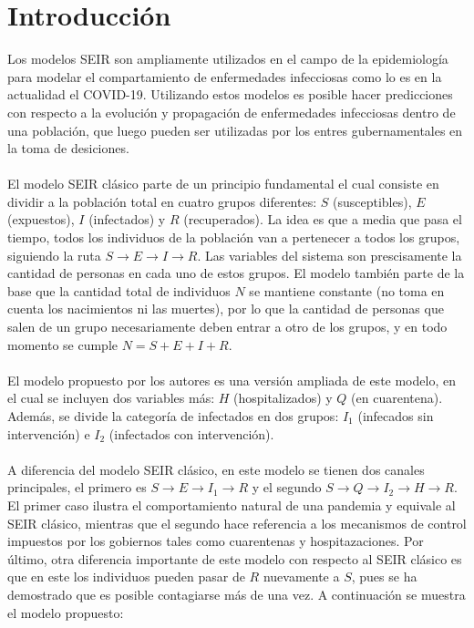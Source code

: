 \documentclass[conference]{IEEEtran}
\begin{document}
\section{Introducción}
Los modelos SEIR son ampliamente utilizados en el campo de la epidemiología para 
modelar el compartamiento de enfermedades infecciosas como lo es en la actualidad 
el COVID-19. Utilizando estos modelos es posible hacer predicciones con respecto 
a la evolución y propagación de enfermedades infecciosas dentro de una población, que 
luego pueden ser utilizadas por los entres gubernamentales en la toma de desiciones.
\\\\
El modelo SEIR clásico parte de un principio fundamental el cual consiste en dividir a
la población total en cuatro grupos diferentes: $S$ (susceptibles), $E$ (expuestos),
$I$ (infectados) y $R$ (recuperados). La idea es que a media que pasa el tiempo, 
todos los individuos de la población van a pertenecer a todos los grupos, siguiendo la 
ruta $S \rightarrow E \rightarrow I \rightarrow R$. Las variables del sistema son
prescisamente la cantidad de personas en cada uno de estos grupos. El modelo también 
parte de la base que la cantidad total de individuos $N$ se mantiene constante (no toma en
cuenta los nacimientos ni las muertes), por lo que la cantidad de personas que salen de
un grupo necesariamente deben entrar a otro de los grupos, y en todo momento se cumple
$N = S + E + I + R$.
\\\\
El modelo propuesto por los autores es una versión ampliada de este modelo, en el cual 
se incluyen dos variables más: $H$ (hospitalizados) y $Q$ (en cuarentena). Además, se
divide la categoría de infectados en dos grupos: $I_1$ (infecados sin intervención)
e $I_2$ (infectados con intervención).
\\\\
A diferencia del modelo SEIR clásico, en este modelo se tienen dos canales principales,
el primero es $S \rightarrow E \rightarrow I_1 \rightarrow R$ y el segundo
$S \rightarrow Q \rightarrow I_2 \rightarrow H \rightarrow R$. El primer 
caso ilustra el comportamiento natural de una pandemia y equivale al SEIR clásico, 
mientras que el segundo hace referencia a los mecanismos de control impuestos por los
gobiernos tales como cuarentenas y hospitazaciones. Por último, otra diferencia 
importante de este modelo con respecto al SEIR clásico es que en este los individuos
pueden pasar de $R$ nuevamente a $S$, pues se ha demostrado que es posible
contagiarse más de una vez. A continuación se muestra el modelo propuesto:
\end{document}
